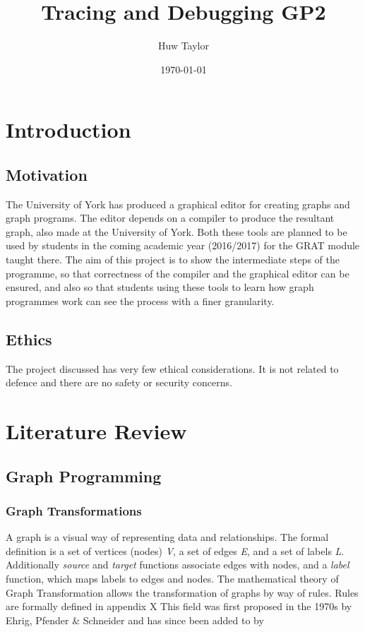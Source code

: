 \documentclass{UoYCSproject}
\author{Huw Taylor}
\title{Tracing and Debugging GP2}
\date{\today}
\begin{document}
\maketitle
\tableofcontents
\listoffigures

\chapter{Introduction}
\section{Motivation}
The University of York has produced a graphical editor for creating graphs and graph programs. The editor depends on a compiler to produce the resultant graph, also made at the University of York. Both these tools are planned to be used by students in the coming academic year (2016/2017) for the GRAT module taught there.
The aim of this project is to show the intermediate steps of the programme, so that correctness of the compiler and the graphical editor can be ensured, and also so that students using these tools to learn how graph programmes work can see the process with a finer granularity.
\section{Ethics}
The project discussed has very few ethical considerations. It is not related to defence and there are no safety or security concerns.

\chapter{Literature Review}
\section{Graph Programming}
\subsection{Graph Transformations}
A graph is a visual way of representing data and relationships. The formal definition is a set of vertices (nodes) \emph{V}, a set of edges \emph{E}, and a set of labels \emph{L}. Additionally \emph{source} and \emph{target} functions associate edges with nodes, and a \emph{label} function, which maps labels to edges and nodes.
The mathematical theory of Graph Transformation allows the transformation of graphs by way of rules.
Rules are formally defined in appendix X %
This field was first proposed in the 1970s by Ehrig, Pfender \& Schneider and has since been added to by %
\end{document}
